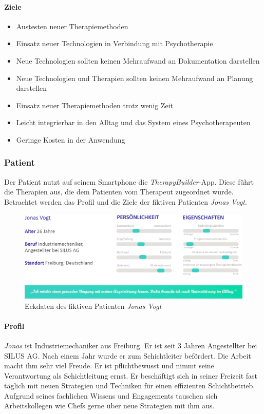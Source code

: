 \paragraph{Ziele}
\begin{itemize}
\item Austesten neuer Therapiemethoden
\item Einsatz neuer Technologien in Verbindung mit Psychotherapie
\item Neue Technologien sollten keinen Mehraufwand an Dokumentation darstellen
\item Neue Technologien und Therapien sollten keinen Mehraufwand an Planung darstellen
\item Einsatz neuer Therapiemethoden trotz wenig Zeit
\item Leicht integrierbar in den Alltag und das System eines Psychotherapeuten
\item Geringe Kosten in der Anwendung
\end{itemize}

\subsubsection{Patient}
Der Patient nutzt auf seinem Smartphone die \emph{TherapyBuilder}-App. Diese führt die Therapien aus, die dem Patienten vom Therapeut zugeordnet wurde. Betrachtet werden das Profil und die Ziele der fiktiven Patienten \emph{Jonas Vogt}.

\begin{figure}[h]
\centering
\includegraphics[width=1\textwidth]{pictures/patient}
\caption{Eckdaten des fiktiven Patienten \emph{Jonas Vogt}}
\label{patient}
\end{figure}

\paragraph{Profil}
\emph{Jonas} ist Industriemechaniker aus Freiburg. Er ist seit 3 Jahren Angestellter bei SILUS AG. Nach einem Jahr wurde er zum Schichtleiter befördert. Die Arbeit macht ihm sehr viel Freude. Er ist pflichtbewusst und nimmt seine Verantwortung als Schichtleitung ernst. Er beschäftigt sich in seiner Freizeit fast täglich mit neuen Strategien und Techniken für einen effizienten Schichtbetrieb. Aufgrund seines fachlichen Wissens und Engagements tauschen sich Arbeitskollegen wie Chefs gerne über neue Strategien mit ihm aus.

